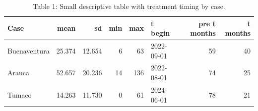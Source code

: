 \begin{table}

\caption{\label{tab:descriptive_table}Table 1: Small descriptive table with treatment timing by case.}
\centering
\begin{tabular}[t]{lrrrrlrr}
\toprule
Case & mean & sd & min & max & t begin & pre t months & t months\\
\midrule
Buenaventura & 25.374 & 12.654 & 6 & 63 & 2022-09-01 & 59 & 40\\
Arauca & 52.657 & 20.236 & 14 & 136 & 2022-08-01 & 74 & 25\\
Tumaco & 14.263 & 11.730 & 0 & 61 & 2024-06-01 & 78 & 21\\
\bottomrule
\end{tabular}
\end{table}
